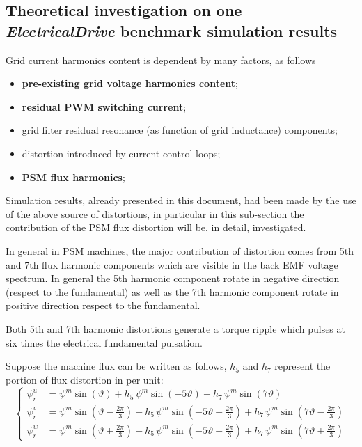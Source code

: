 \documentclass[12pt,a4paper]{scrartcl}
\begin{document}
\begin{onehalfspace}
\subsection{Theoretical investigation on one \textit{ElectricalDrive} benchmark simulation results}\label{fifth_harmonic_psm}
Grid current harmonics content is dependent by many factors, as follows
\begin{itemize}
	\item[--] \textbf{pre-existing grid voltage harmonics content};
	\item[--] \textbf{residual PWM switching current};
	\item[--] grid filter residual resonance (as function of grid inductance) components;
	\item[--] distortion introduced by current control loops;	 
	\item[--] \textbf{PSM flux harmonics};	 
\end{itemize} 
Simulation results, already presented in this document, had been made by the use of the above source of distortions, in particular in this sub-section the contribution of the PSM flux distortion will be, in detail, investigated. 

In general in PSM machines, the major contribution of distortion comes from 5th and 7th flux harmonic components which are visible in the back EMF voltage spectrum. In general the 5th harmonic component rotate in negative direction (respect to the fundamental) as well as the 7th harmonic component rotate in positive direction respect to the fundamental. 

Both 5th and 7th harmonic distortions generate a torque ripple which pulses at six times the electrical fundamental pulsation.

Suppose the machine flux can be written as follows, $h_5$ and $h_7$ represent the portion of flux distortion in per unit:
\begin{equation}
	\left\lbrace 
	\begin{aligned}
		\psi_r^u &=\psi^m\sin\left(\vartheta\right) + h_{5}\,\psi^m\sin\left({-5\vartheta}\right) + h_{7}\,\psi^m\sin\left({7\vartheta}\right) \\[6pt]
		\psi_r^v &=\psi^m\sin\left(\vartheta-\frac{{2\pi}}{3}\right) + h_{5}\,\psi^m\sin\left({-5\vartheta-\frac{{2\pi}}{3}}\right) + h_{7}\,\psi^m\sin\left({7\vartheta-\frac{{2\pi}}{3}}\right) \\[6pt]
		\psi_r^w &=\psi^m\sin\left(\vartheta+\frac{{2\pi}}{3}\right) + h_{5}\,\psi^m\sin\left({-5\vartheta+\frac{{2\pi}}{3}}\right) + h_{7}\,\psi^m\sin\left({7\vartheta+\frac{{2\pi}}{3}}\right)
	\end{aligned}
	\right. 
\end{equation}



\end{onehalfspace}
\end{document}
